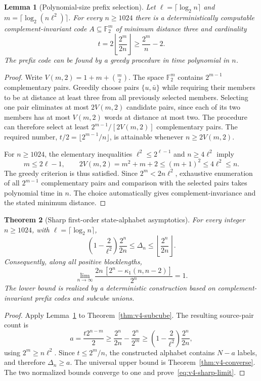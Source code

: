 \documentclass[11pt,a4paper]{article}
\newtheorem{theorem}{Theorem}[section]
\newtheorem{lemma}[theorem]{Lemma}
\begin{document}
\begin{lemma}[Polynomial-size prefix selection]\label{lem:v4-prefix}
Let $\ell=\lceil\log_2 n\rceil$ and $m=\lceil\log_2(n\ell^2)\rceil$. For every $n\ge1024$ there is a deterministically computable complement-invariant code $A\subseteq\mathbb F_2^m$ of minimum distance three and cardinality
\begin{equation}\label{eq:v4-prefix-size}
 t=2\left\lfloor\frac{2^m}{2n}\right\rfloor
 \ge\frac{2^m}{n}-2.
\end{equation}
The prefix code can be found by a greedy procedure in time polynomial in $n$.
\end{lemma}
\begin{proof}
Write $V(m,2)=1+m+\binom m2$. The space $\mathbb F_2^m$ contains $2^{m-1}$ complementary pairs. Greedily choose pairs $\{u,\bar u\}$ while requiring their members to be at distance at least three from all previously selected members. Selecting one pair eliminates at most $2V(m,2)$ candidate pairs, since each of its two members has at most $V(m,2)$ words at distance at most two. The procedure can therefore select at least $2^{m-1}/[2V(m,2)]$ complementary pairs. The required number, $t/2=\lfloor2^{m-1}/n\rfloor$, is attainable whenever $n\ge2V(m,2)$.

For $n\ge1024$, the elementary inequalities $\ell^2\le2^{\ell-1}$ and $n\ge4\ell^2$ imply
\[
 m\le2\ell-1,\qquad 2V(m,2)=m^2+m+2
 \le(m+1)^2\le4\ell^2\le n.
\]
The greedy criterion is thus satisfied. Since $2^m<2n\ell^2$, exhaustive enumeration of all $2^{m-1}$ complementary pairs and comparison with the selected pairs takes polynomial time in $n$. The choice automatically gives complement-invariance and the stated minimum distance.
\end{proof}

\begin{theorem}[Sharp first-order state-alphabet asymptotics]\label{thm:v4-main}
For every integer $n\ge1024$, with $\ell=\lceil\log_2n\rceil$,
\begin{equation}\label{eq:v4-sharp-bounds}
 \boxed{\quad
 \left(1-\frac2{\ell^2}\right)\frac{2^n}{2n}
 \le\Delta_n\le\left\lfloor\frac{2^n}{2n}\right\rfloor.\quad}
\end{equation}
Consequently, along \emph{all} positive blocklengths,
\begin{equation}\label{eq:v4-sharp-limit}
 \boxed{\qquad\lim_{n\to\infty}\frac{2n\,[2^n-\kappa_1(n,n-2)]}{2^n}=1.\qquad}
\end{equation}
The lower bound is realized by a deterministic construction based on complement-invariant prefix codes and subcube unions.
\end{theorem}
\begin{proof}
Apply Lemma~\ref{lem:v4-prefix} to Theorem~\ref{thm:v4-subcube}. The resulting source-pair count is
\[
 a=\frac{t2^{n-m}}2
 \ge\frac{2^n}{2n}-\frac{2^n}{2^m}
 \ge\left(1-\frac2{\ell^2}\right)\frac{2^n}{2n},
\]
using $2^m\ge n\ell^2$. Since $t\le2^m/n$, the constructed alphabet contains $N-a$ labels, and therefore $\Delta_n\ge a$. The universal upper bound is Theorem~\ref{thm:v4-converse}. The two normalized bounds converge to one and prove~\eqref{eq:v4-sharp-limit}.
\end{proof}
\end{document}
